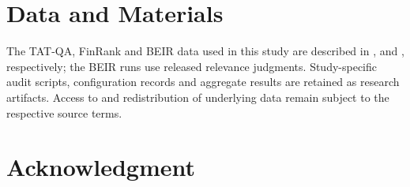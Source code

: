 \documentclass[conference]{IEEEtran}
\begin{document}
\section{Data and Materials}\label{data-and-materials}

The TAT-QA, FinRank and BEIR data used in this study are described in
\cite{r9}, \cite{r1} and \cite{r2}, respectively; the BEIR runs use
released relevance judgments. Study-specific audit scripts,
configuration records and aggregate results are retained as research
artifacts. Access to and redistribution of underlying data remain
subject to the respective source terms.

\section*{Acknowledgment}
\end{document}
